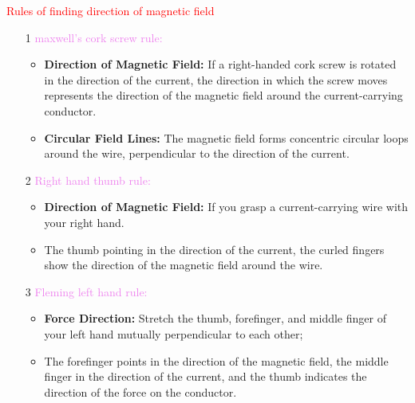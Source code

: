 \documentclass{beamer}
\begin{document}
\begin{frame}
\textcolor{red}{Rules of finding direction of magnetic field}
\begin{itemize}
\item[1] \textcolor{violet}{maxwell's cork screw rule:}
\begin{itemize}
\item \textbf{Direction of Magnetic Field:} If a right-handed cork screw is rotated in the direction of the current, the direction in which the screw moves represents the direction of the magnetic field around the current-carrying conductor.

\item \textbf{Circular Field Lines:} The magnetic field forms concentric circular loops around the wire, perpendicular to the direction of the current.
\end{itemize}
\item[2] \textcolor{violet}{Right hand thumb rule:}
\begin{itemize}
\item \textbf{Direction of Magnetic Field:} If you grasp a current-carrying wire with your right hand.
\item The thumb pointing in the direction of the current, the curled fingers show the direction of the magnetic field around the wire.  


\end{itemize}
\item[3] \textcolor{violet}{Fleming left hand rule:}
\begin{itemize}
\item \textbf{Force Direction:} Stretch the thumb, forefinger, and middle finger of your left hand mutually perpendicular to each other; 
\item The forefinger points in the direction of the magnetic field, the middle finger in the direction of the current, and the thumb indicates the direction of the force on the conductor.

\end{itemize}
\end{itemize}
\end{frame}
\end{document}
